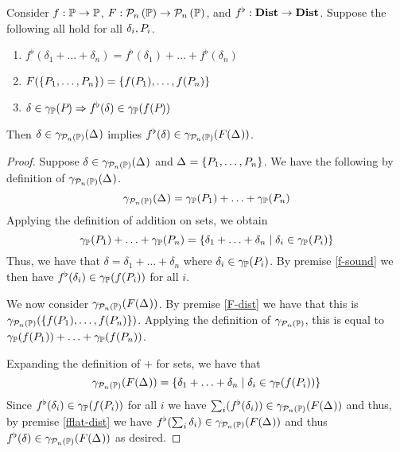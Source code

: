 \newcommand{\fflat}{f^{\flat}}
\begin{lemma}
\label{lem:distributes-plus}
Consider $f : \mathbb{P} \rightarrow \mathbb{P}$, $F : \mathcal{P}_{n}\left( \mathbb{P} \right) \rightarrow \mathcal{P}_{n}\left( \mathbb{P} \right)$, and $\fflat : \dists \rightarrow \dists$.  Suppose the following all hold for all $\delta_i, P_{i}$.
\begin{enumerate}
\setlength{\itemsep}{0.5em}
\item
\label{fflat-dist}
$\fflat(\delta_1 + \ldots + \delta_n) = \fflat(\delta_1) + \ldots + \fflat(\delta_n)$
\item
\label{F-dist}
$F(\{P_{1}, \ldots, P_{n}\}) = \{f(P_{1}), \ldots, f(P_{n})\}$
\item
\label{f-sound}
$\delta \in \ppconc{\pp{}} \imp \fflat(\delta) \in \ppconc{f(\pp{})}$
\end{enumerate}
Then $\delta \in \gamma_{\mathcal{P}_{n}\left( \mathbb{P} \right)}(\Delta_{})$ implies $\fflat(\delta) \in \ppsconc{F(\pps{})}$.
\end{lemma}

\begin{proof}
Suppose $\delta \in \gamma_{\mathcal{P}_{n}\left( \mathbb{P} \right)}(\Delta_{})$ and $\Delta_{} = \{P_{1},\ldots,P_{n}\}$.  We have the following by definition of $\gamma_{\mathcal{P}_{n}\left( \mathbb{P} \right)}(\Delta_{})$.
\[\gamma_{\mathcal{P}_{n}\left( \mathbb{P} \right)}(\Delta_{}) = \gamma_{\mathbb{P}}(P_{1}) + \ldots + \gamma_{\mathbb{P}}(P_{n})\]
Applying the definition of addition on sets, we obtain
\[\gamma_{\mathbb{P}}(P_{1}) + \ldots + \gamma_{\mathbb{P}}(P_{n}) = \{\delta_1 + \ldots + \delta_n \mid \delta_i \in \gamma_{\mathbb{P}}(P_{i})\}\]
Thus, we have that $\delta = \delta_1 + \ldots + \delta_n$ where $\delta_i \in \gamma_{\mathbb{P}}(P_{i})$.
By premise \ref{f-sound} we then have $\fflat(\delta_i) \in \ppconc{f(\pp{i})}$ for all $i$.

We now consider $\gamma_{\mathcal{P}_{n}\left( \mathbb{P} \right)}(F(\Delta_{}))$.  By premise \ref{F-dist} we
have that this is $\gamma_{\mathcal{P}_{n}\left( \mathbb{P} \right)}(\{f(P_{1}), \ldots, f(P_{n})\})$.
Applying the definition of $\gamma_{\mathcal{P}_{n}\left( \mathbb{P} \right)}$, this is equal to
$\gamma_{\mathbb{P}}(f(P_{1})) + \ldots + \gamma_{\mathbb{P}}(f(P_{n}))$.

Expanding the definition of $+$ for sets, we have that
\[\gamma_{\mathcal{P}_{n}\left( \mathbb{P} \right)}(F(\Delta_{})) = \{\delta_1 + \ldots + \delta_n \mid \delta_i \in \gamma_{\mathbb{P}}(f(P_{i}))\}\]
Since $\fflat(\delta_i) \in \ppconc{f(\pp{i})}$ for all $i$ we have $\sum_i(\fflat(\delta_i)) \in \ppsconc{F(\pps{})}$ and thus, by premise \ref{fflat-dist} we have $\fflat(\sum_i\delta_i) \in \ppsconc{F(\pps{})}$ and thus $\fflat(\delta) \in \ppsconc{F(\pps{})}$ as desired.
\end{proof}

